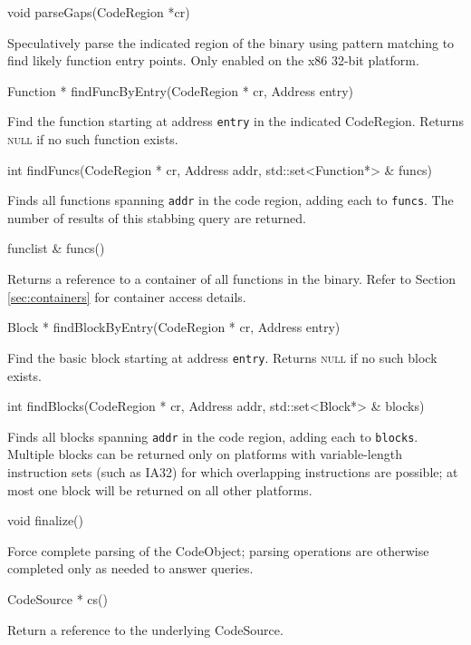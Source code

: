 \documentclass{article}
\newenvironment{apient}{\small\verbatim}{\endverbatim}
\newcommand{\apidesc}[1]{%
{\addtolength{\leftskip}{4em}%
#1\par\medskip}
}
\begin{document}
\begin{apient}
void parseGaps(CodeRegion *cr)
\end{apient}
\apidesc{Speculatively parse the indicated region of the binary using pattern matching to find likely function entry points. Only enabled on the x86 32-bit platform.}

\begin{apient}
Function * findFuncByEntry(CodeRegion * cr, Address entry)
\end{apient}
\apidesc{Find the function starting at address \texttt{entry} in the indicated CodeRegion. Returns {\scshape null} if no such function exists.}

\begin{apient}
int findFuncs(CodeRegion * cr, Address addr, std::set<Function*> & funcs)
\end{apient}
\apidesc{Finds all functions spanning \texttt{addr} in the code region, adding each to \texttt{funcs}. The number of results of this stabbing query are returned.}

\begin{apient}
funclist & funcs()
\end{apient}
\apidesc{Returns a reference to a container of all functions in the binary. Refer to Section \ref{sec:containers} for container access details.}

\begin{apient}
Block * findBlockByEntry(CodeRegion * cr, Address entry)
\end{apient}
\apidesc{Find the basic block starting at address \texttt{entry}. Returns {\scshape null} if no such block exists.}

\begin{apient}
int findBlocks(CodeRegion * cr, Address addr, std::set<Block*> & blocks)
\end{apient}
\apidesc{Finds all blocks spanning \texttt{addr} in the code region, adding each to \texttt{blocks}. Multiple blocks can be returned only on platforms with variable-length instruction sets (such as IA32) for which overlapping instructions are possible; at most one block will be returned on all other platforms.}

\begin{apient}
void finalize()
\end{apient}
\apidesc{Force complete parsing of the CodeObject; parsing operations are otherwise completed only as needed to answer queries.}

\begin{apient}
CodeSource * cs()
\end{apient}
\apidesc{Return a reference to the underlying CodeSource.}
\end{document}
